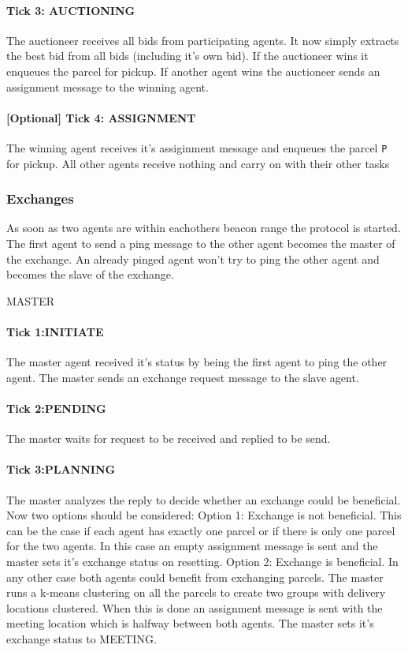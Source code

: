 \documentclass[../main.tex]{subfiles}
\begin{document}
\paragraph{Tick 3: AUCTIONING}
The auctioneer receives all bids from participating agents.
It now simply extracts the best bid from all bids (including it's own bid).
If the auctioneer wins it enqueues the parcel for pickup. 
If another agent wins the auctioneer sends an assignment message to the winning agent.
\paragraph{[Optional] Tick 4: ASSIGNMENT}
The winning agent receives it's assiginment message and enqueues the parcel \texttt{P} for pickup.
All other agents receive nothing and carry on with their other tasks 

\subsubsection{Exchanges}
As soon as two agents are within eachothers beacon range the protocol is started.
The first agent to send a ping message to the other agent becomes the master of the exchange.
An already pinged agent won't try to ping the other agent and becomes the slave of the exchange.

MASTER
\paragraph{Tick 1:INITIATE}
The master agent received it's status by being the first agent to ping the other agent.
The master sends an exchange request message to the slave agent. 
\paragraph{Tick 2:PENDING}
The master waits for request to be received and replied to be send.
\paragraph{Tick 3:PLANNING}
The master analyzes the reply to decide whether an exchange could be beneficial.
Now two options should be considered:
Option 1: Exchange is not beneficial.
This can be the case if each agent has exactly one parcel or if there is only one parcel for the two agents. 
In this case an empty assignment message is sent and the master sets it's exchange status on resetting.
Option 2: Exchange is beneficial.
In any other case both agents could benefit from exchanging parcels.
The master runs a k-means clustering on all the parcels to create two groups with delivery locations clustered.
When this is done an assignment message is sent with the meeting location which is halfway between both agents.
The master sets it's exchange status to MEETING.
\end{document}
